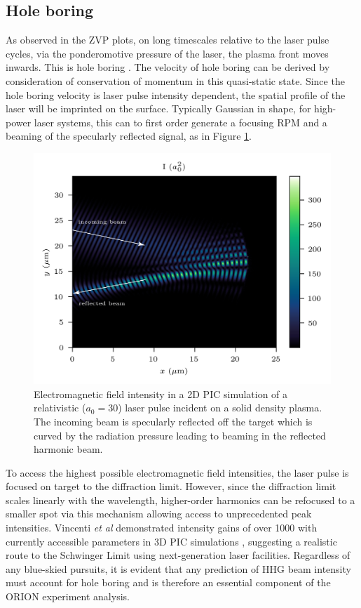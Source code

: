 \subsection{Hole boring}
As observed in the ZVP plots, on long timescales relative to the laser pulse cycles, via the ponderomotive pressure of the laser, the plasma front moves inwards. This is hole boring \cite{wilksAbsorptionUltraIntenseLaser1992}. The velocity of hole boring can be derived by consideration of conservation of momentum in this quasi-static state. Since the hole boring velocity is laser pulse intensity dependent, the spatial profile of the laser will be imprinted on the surface. Typically Gaussian in shape, for high-power laser systems, this can to first order generate a focusing \ac{RPM} and a beaming of the specularly reflected signal, as in Figure \ref{fig:orionholeboring}.
\begin{figure}
	\centering
	\includegraphics[width=0.9\linewidth]{figures/orion/orion_hole_boring}
	\caption[2D PIC simulation of HHG beaming effect via hole boring.]{Electromagnetic field intensity in a 2D PIC simulation of a relativistic ($a_0 = 30$) laser pulse incident on a solid density plasma. The incoming beam is specularly reflected off the target which is curved by the radiation pressure leading to beaming in the reflected harmonic beam.}
	\label{fig:orionholeboring}
\end{figure}
To access the highest possible electromagnetic field intensities, the laser pulse is focused on target to the diffraction limit. However, since the diffraction limit scales linearly with the wavelength, higher-order harmonics can be refocused to a smaller spot via this mechanism allowing access to unprecedented peak intensities. Vincenti \textit{et al} demonstrated intensity gains of over 1000 with currently accessible parameters in \ac{3D} \ac{PIC} simulations \cite{vincentiAchievingExtremeLight2019}, suggesting a realistic route to the Schwinger Limit using next-generation laser facilities. Regardless of any blue-skied pursuits, it is evident that any prediction of \ac{HHG} beam intensity must account for hole boring and is therefore an essential component of the ORION experiment analysis.

